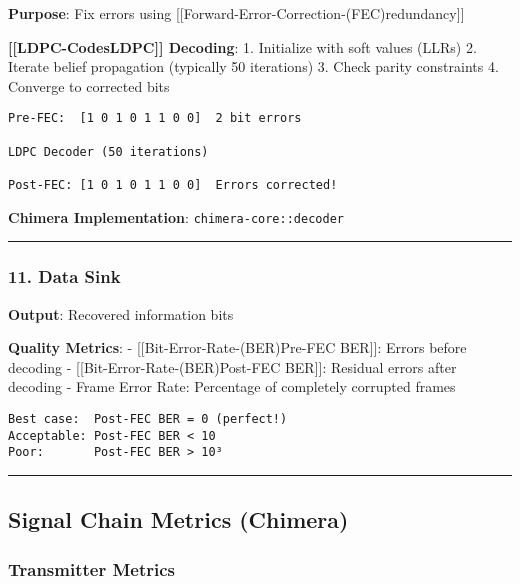 \textbf{Purpose}: Fix errors using
{[}{[}Forward-Error-Correction-(FEC)\textbar redundancy{]}{]}

\textbf{{[}{[}LDPC-Codes\textbar LDPC{]}{]} Decoding}: 1. Initialize
with soft values (LLRs) 2. Iterate belief propagation (typically 50
iterations) 3. Check parity constraints 4. Converge to corrected bits

\begin{verbatim}
Pre-FEC:  [1 0 1 0 1 1 0 0]  2 bit errors
                       
LDPC Decoder (50 iterations)
                
Post-FEC: [1 0 1 0 1 1 0 0]  Errors corrected! 
\end{verbatim}

\textbf{Chimera Implementation}: \texttt{chimera-core::decoder}

\begin{center}\rule{0.5\linewidth}{0.5pt}\end{center}

\subsubsection{11. Data Sink}\label{data-sink}

\textbf{Output}: Recovered information bits

\textbf{Quality Metrics}: - {[}{[}Bit-Error-Rate-(BER)\textbar Pre-FEC
BER{]}{]}: Errors before decoding -
{[}{[}Bit-Error-Rate-(BER)\textbar Post-FEC BER{]}{]}: Residual errors
after decoding - Frame Error Rate: Percentage of completely corrupted
frames

\begin{verbatim}
Best case:  Post-FEC BER = 0 (perfect!) 
Acceptable: Post-FEC BER < 10
Poor:       Post-FEC BER > 10³
\end{verbatim}

\begin{center}\rule{0.5\linewidth}{0.5pt}\end{center}

\subsection{Signal Chain Metrics
(Chimera)}\label{signal-chain-metrics-chimera}

\subsubsection{Transmitter Metrics}\label{transmitter-metrics}

